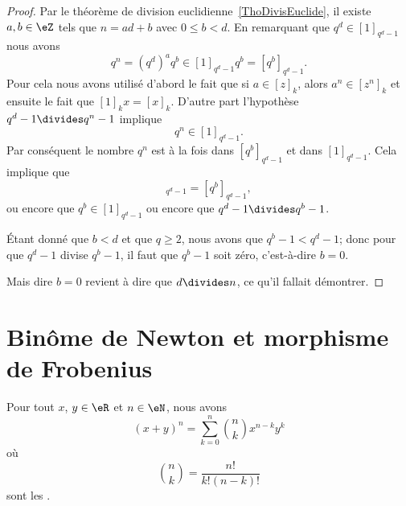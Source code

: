 \begin{proof}
    Par le théorème de division euclidienne~\ref{ThoDivisEuclide}, il existe \( a,b\in \eZ\) tels que \( n=ad+b\) avec \( 0\leq b<d\). En remarquant que \( q^d\in[1]_{q^d-1}\) nous avons
    \begin{equation}
        q^n=(q^d)^aq^b\in[1]_{q^d-1}q^b=[q^b]_{q^d-1}.
    \end{equation}
    Pour cela nous avons utilisé d'abord le fait que si \( a\in [z]_k\), alors \( a^n\in[z^n]_k\) et ensuite le fait que \( [1]_kx=[x]_k\). D'autre part l'hypothèse \( q^d-1\divides q^n-1\) implique
    \begin{equation}
        q^n\in[1]_{q^d-1}.
    \end{equation}
    Par conséquent le nombre \( q^n\) est à la fois dans \( [q^b]_{q^d-1}\) et dans \( [1]_{q^d-1}\). Cela implique que
    \begin{equation}
        [1]_{q^d-1}=[q^b]_{q^d-1},
    \end{equation}
    ou encore que \( q^b\in[1]_{q^d-1}\) ou encore que \( q^d-1\divides q^b-1\).

    Étant donné que \( b<d\) et que \( q\geq 2\), nous avons que \( q^b-1<q^d-1\); donc pour que \( q^d-1\) divise \( q^b-1\), il faut que \( q^b-1\) soit zéro, c'est-à-dire \( b=0\).

    Mais dire \( b=0\) revient à dire que \( d\divides n\), ce qu'il fallait démontrer.
\end{proof}

\section{Binôme de Newton et morphisme de Frobenius}

\begin{proposition}     \label{PropBinomFExOiL}
Pour tout $x$, $y\in\eR$ et $n\in\eN$, nous avons
\begin{equation}        \label{EqNewtonB}
    (x+y)^n=\sum_{k=0}^n{n\choose k}x^{n-k}y^k
\end{equation}
où
\begin{equation}
    {n\choose k}=\frac{ n! }{ k!(n-k)! }
\end{equation}
sont les .
\end{proposition}

